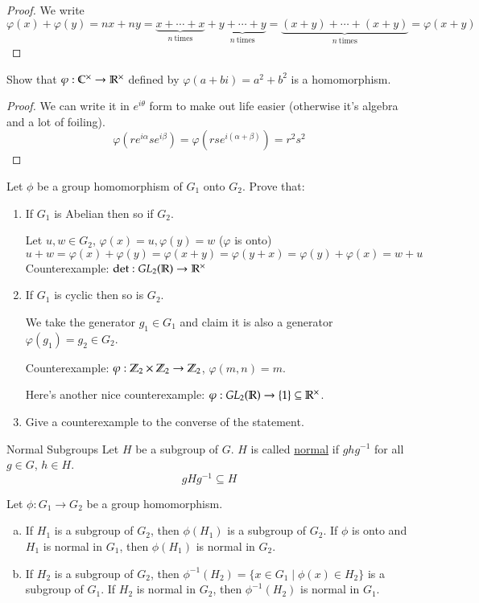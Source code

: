\begin{proof}
	We write
	\[\varphi(x)+\varphi(y) = nx + ny = \underbrace{x + \cdots + x}_{n\ \text{times}} + \underbrace{y + \cdots + y}_{n\ \text{times}} = \underbrace{(x+y) + \cdots + (x+y)}_{n\ \text{times}}=\varphi(x + y)\]
\end{proof}

\exercise Show that $\varphi:\mathbb{C}^\times \to \mathbb{R}^\times$ defined by $\varphi(a+bi) = a^2+b^2$ is a homomorphism. 

\begin{proof}
We can write it in $e^{i\theta}$ form to make out life easier (otherwise it's algebra and a lot of foiling). 
\[\varphi(re^{i\alpha}se^{i\beta}) = \varphi(rs e^{i(\alpha+\beta)})=r^2s^2\]	
\end{proof}

\exercise Let $\phi$ be a group homomorphism of $G_1$ onto $G_2$. Prove that: 

\begin{enumerate}
	\item If $G_1$ is Abelian then so if $G_2$. 
	
	Let $u,w\in G_2$, $\varphi(x)=u, \varphi(y)=w$ ($\varphi$ is onto)
	\[u+w = \varphi(x) + \varphi(y) = \varphi(x+y) = \varphi(y+x) = \varphi(y) + \varphi(x) =  w + u\]
	Counterexample: $\det : GL_2(\mathbb{R}) \to \mathbb{R}^\times$
	\item If $G_1$ is cyclic then so is $G_2$. 
	
	We take the generator $g_1\in G_1$ and claim it is also a generator $\varphi(g_1) = g_2\in G_2$. 
	
	Counterexample: $\varphi: \mathbb{Z}_2\times \mathbb{Z}_2\to \mathbb{Z}_2$, $\varphi(m,n) = m$. 
	
	Here's another nice counterexample: $\varphi: GL_2(\mathbb{R})\to \{1\}\subseteq \mathbb{R}^\times$. 
	\item Give a counterexample to the converse of the statement. 
\end{enumerate}

\begin{defn}{Normal Subgroups}
Let $H$ be a subgroup of $G$. $H$ is called \ul{normal} if $ghg^{-1}$ for all $g\in G$, $h\in H$. 
\begin{equation}
gHg^{-1}\subseteq H	
\end{equation}
\end{defn}

\begin{proposition}
	Let $\phi:G_1\to G_2$ be a group homomorphism. 
	\begin{enumerate}[(a)]
		\item If $H_1$ is a subgroup of $G_2$, then $\phi(H_1)$ is a subgroup of $G_2$. If $\phi$ is onto and $H_1$ is normal in $G_1$, then $\phi(H_1)$ is normal in $G_2$. 
		\item If $H_2$ is a subgroup of $G_2$, then $\phi^{-1}(H_2)=\{x\in G_1\mid \phi(x)\in H_2\}$ is a subgroup of $G_1$. If $H_2$ is normal in $G_2$, then $\phi^{-1}(H_2)$ is normal in $G_1$. 
	\end{enumerate}
\end{proposition}

